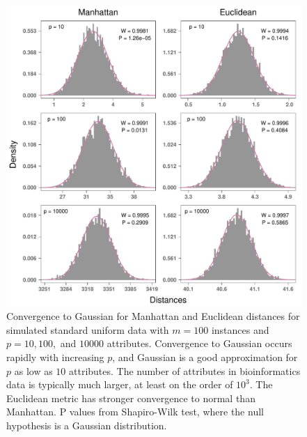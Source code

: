 \documentclass[10pt,letterpaper]{article}\usepackage[]{graphicx}\usepackage[]{color}
\begin{document}
\vspace*{0.2in}

{\Large	
	\textbf{} %
}

\begin{figure}[H]
	\includegraphics[width=\textwidth]{central_limit_hist_uniform_standard.pdf}
	\caption{Convergence to Gaussian for Manhattan and Euclidean distances for simulated standard uniform data with $m=100$ instances and $p=10, 100,$ and $10000$ attributes. Convergence to Gaussian occurs rapidly with increasing $p$, and Gaussian is a good approximation for $p$ as low as $10$ attributes. The number of attributes in bioinformatics data is typically much larger, at least on the order of $10^3$. The Euclidean metric has stronger convergence to normal than Manhattan. P values from Shapiro-Wilk test, where the null hypothesis is a Gaussian distribution.}
\end{figure}
\end{document}
